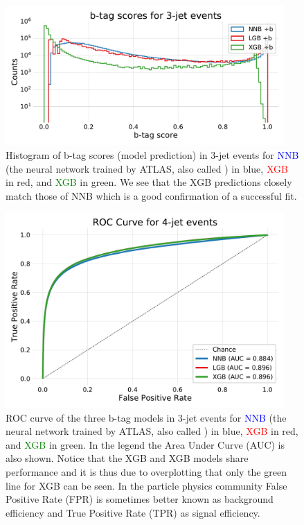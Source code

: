 \documentclass[a4paper, twoside, nobib]{tufte-book}
\newcommand{\code}[1]{\colorbox{light-gray}{\texttt{\detokenize{#1}}}}
\begin{document}
\begin{figure}
  \includegraphics[width=0.95\textwidth, trim=0 0 0 30, clip]{figures/quarks/y_pred_3_jet_hist-down_sample=1.00-ML_vars=vertex-selection=b-ejet_min=4-n_iter_RS_lgb=99-n_iter_RS_xgb=9-cdot_cut=0.90-version=19.pdf}
  \caption[b-tag scores in 3-jet events]
          {Histogram of b-tag scores (model prediction) in 3-jet events for \textcolor{blue}{NNB} (the neural network trained by ATLAS, also called \code{nnbjet}) in blue, \textcolor{red}{XGB} in red, and \textcolor{green}{XGB} in green. We see that the XGB predictions closely match those of NNB which is a good confirmation of a successful fit.  
          } 
  \label{fig:q:btag_scores_3j}
\end{figure}




\begin{figure}
  \includegraphics[width=0.95\textwidth, trim=10 10 10 40, clip]{figures/quarks/ROC_4_jet-down_sample=1.00-ML_vars=vertex-selection=b-ejet_min=4-n_iter_RS_lgb=99-n_iter_RS_xgb=9-cdot_cut=0.90-version=19.pdf}
  \caption[ROC curve for b-tag in 4-jet events]
          {ROC curve of the three b-tag models in 3-jet events for \textcolor{blue}{NNB} (the neural network trained by ATLAS, also called \code{nnbjet}) in blue, \textcolor{red}{XGB} in red, and \textcolor{green}{XGB} in green. In the legend the Area Under Curve (AUC) is also shown. Notice that the XGB and XGB models share performance and it is thus due to overplotting that only the green line for XGB can be seen. In the particle physics community False Positive Rate (FPR) is sometimes better known as background efficiency and True Positive Rate (TPR) as signal efficiency.  
          } 
  \label{fig:q:roc_btag_4j}
\end{figure}
\end{document}
